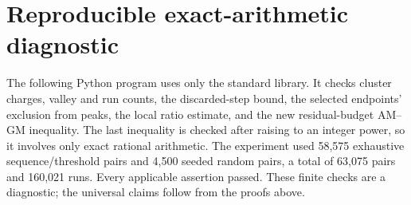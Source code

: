 \documentclass[11pt]{amsart}
\theoremstyle{definition}
\theoremstyle{remark}
\begin{document}
\appendix
\section{Reproducible exact-arithmetic diagnostic}\label{app:checks}
The following Python program uses only the standard library. It checks
cluster charges, valley and run counts, the discarded-step bound, the
selected endpoints' exclusion from peaks, the local ratio estimate, and
the new residual-budget AM--GM inequality. The last inequality is checked
after raising to an integer power, so it involves only exact rational
arithmetic. The experiment used 58,575 exhaustive sequence/threshold
pairs and 4,500 seeded random pairs, a total of 63,075 pairs and 160,021
runs. Every applicable assertion passed. These finite checks are a
diagnostic; the universal claims follow from the proofs above.
\end{document}
